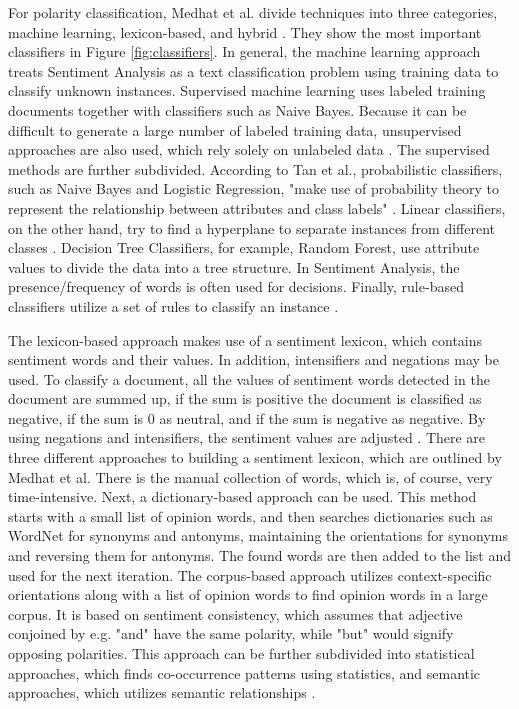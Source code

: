 For polarity classification, Medhat et al. divide techniques into three categories, machine learning, lexicon-based, and hybrid \cite{MEDHAT20141093}. They show the most important classifiers in Figure \ref{fig:classifiers}. In general, the machine learning approach treats Sentiment Analysis as a text classification problem using training data to classify unknown instances. Supervised machine learning uses labeled training documents together with classifiers such as Naive Bayes. Because it can be difficult to generate a large number of labeled training data, unsupervised approaches are also used, which rely solely on unlabeled data \cite{MEDHAT20141093}. The supervised methods are further subdivided. According to Tan et al., probabilistic classifiers, such as Naive Bayes and Logistic Regression, "make use of probability theory to represent the relationship between attributes and class labels" \cite[p.~414]{DBLP:books/aw/TanSKK2019}. Linear classifiers, on the other hand, try to find a hyperplane to separate instances from different classes \cite{MEDHAT20141093}. Decision Tree Classifiers, for example, Random Forest, use attribute values to divide the data into a tree structure. In Sentiment Analysis, the presence/frequency of words is often used for decisions. Finally, rule-based classifiers utilize a set of rules to classify an instance \cite{DBLP:books/aw/TanSKK2019}.

The lexicon-based approach makes use of a sentiment lexicon, which contains sentiment words and their values. In addition, intensifiers and negations may be used. To classify a document, all the values of sentiment words detected in the document are summed up, if the sum is positive the document is classified as negative, if the sum is 0 as neutral, and if the sum is negative as negative. By using negations and intensifiers, the sentiment values are adjusted \cite{liu_2015}. There are three different approaches to building a sentiment lexicon, which are outlined by Medhat et al. There is the manual collection of words, which is, of course, very time-intensive. Next, a dictionary-based approach can be used. This method starts with a small list of opinion words, and then searches dictionaries such as WordNet for synonyms and antonyms, maintaining the orientations for synonyms and reversing them for antonyms. The found words are then added to the list and used for the next iteration. The corpus-based approach utilizes context-specific orientations along with a list of opinion words to find opinion words in a large corpus. It is based on sentiment consistency, which assumes that adjective conjoined by e.g. "and" have the same polarity, while "but" would signify opposing polarities. This approach can be further subdivided into statistical approaches, which finds co-occurrence patterns using statistics, and semantic approaches, which utilizes semantic relationships \cite{MEDHAT20141093}.








